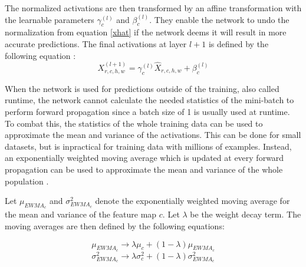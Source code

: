 \documentclass[a4paper, twoside]{article}
\begin{document}
The normalized activations are then transformed by an affine transformation with the learnable parameters $\gamma_{c}^{(l)}$ and $\beta_{c}^{(l)}$. They enable the network to undo the normalization from equation \eqref{xhat} if the network deems it will result in more accurate predictions. The final activations at layer $l+1$ is defined by the following equation \cite{cs231n} \cite{batchnorm}:
\begin{equation}\label{eqbn}
X^{(l+1)}_{r,c,h,w} = \gamma_{c}^{(l)} \hat{X}_{r,c,h,w} + \beta_{c}^{(l)}
\end{equation}

When the network is used for predictions outside of the training, also called runtime, the network cannot calculate the needed statistics of the mini-batch to perform forward propagation since a batch size of 1 is usually used at runtime. To combat this, the statistics of the whole training data can be used to approximate the mean and variance of the activations. This can be done for small datasets, but is inpractical for training data with millions of examples. Instead, an exponentially weighted moving average which is updated at every forward propagation can be used to approximate the mean and variance of the whole population \cite{cs231n} \cite{batchnorm}. 

Let $\mu_{EWMA_c}$ and $\sigma^2_{EWMA_c}$ denote the exponentially weighted moving average for the mean and variance of the feature map $c$. Let $\lambda$ be the weight decay term. The moving averages are then defined by the following equations:

\begin{equation}\label{eqewmamu}
\mu_{EWMA_c} \to \lambda \mu_c + (1-\lambda)\mu_{EWMA_c}
\end{equation}
\begin{equation}\label{eqewmasigma}
\sigma^2_{EWMA_c} \to \lambda \sigma^2_c + (1-\lambda)\sigma^2_{EWMA_c}
\end{equation}
\end{document}
